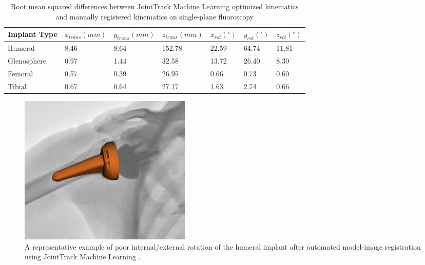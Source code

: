 \begin{table}
	\caption{Root mean squared differences between JointTrack Machine Learning optimized kinematics and manually registered kinematics on single-plane fluoroscopy} \label{tab:jtml-tsa-tka-vals}
	\begin{tabularx}{\linewidth}{|X|X|X|X|X|X|X|}\hline
		{\bf Implant Type} & $x_{trans} (mm)$ & $y_{trans} (mm)$ & $z_{trans} (mm)$ & $x_{rot} (^{\circ})$ & $y_{rot} (^{\circ})$ & $z_{rot} (^{\circ})$ \\ \hline
		Humeral            & 8.46             & 8.64             & 152.78           & 22.59                & 64.74                & 11.81                \\\hline
		Glenosphere        & 0.97             & 1.44             & 32.58            & 13.72                & 26.40                & 8.30                 \\\hline
		Femoral            & 0.57             & 0.39             & 26.95            & 0.66                 & 0.73                 & 0.60                 \\\hline
		Tibial             & 0.67             & 0.64             & 27.17            & 1.63                 & 2.74                 & 0.66                 \\\hline
	\end{tabularx}
\end{table}


\begin{figure}[h!]
	\centering
	\includegraphics[width=0.4\textwidth]{BAD_IE_HUM.png}
	\caption{A representative example of poor internal/external rotation of the humeral implant after automated model-image registration using JointTrack Machine Learning \cite{jensenJointTrackMachine2023}.}
	\label{fig:bad_ie_hum}
\end{figure}


